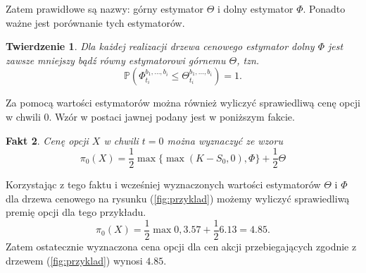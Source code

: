 \documentclass[12pt]{article}
\newtheorem{theorem}{Twierdzenie}
\newtheorem{fact}[theorem]{Fakt}
\begin{document}
\noindent Zatem prawidłowe są nazwy: górny estymator $\Theta$ i dolny estymator $\Phi$. Ponadto ważne jest porównanie tych estymatorów.
\begin{theorem}
Dla każdej realizacji drzewa cenowego estymator dolny $\Phi$ jest zawsze mniejszy bądź równy estymatorowi górnemu $\Theta$, tzn.
\begin{equation*}
\mathbb{P}(\Phi_{t_i}^{b_1,\ldots,b_i}\leq \Theta_{t_i}^{b_1,\ldots,b_i}) = 1.
\end{equation*}
\end{theorem} 

\noindent Za pomocą wartości estymatorów można również wyliczyć sprawiedliwą cenę opcji w chwili $0$. Wzór w postaci jawnej podany jest w poniższym fakcie.
\begin{fact}
Cenę opcji $X$ w chwili $t=0$ można wyznaczyć ze wzoru
\begin{equation*}
\pi_0(X) = \frac{1}{2}\max\{\max(K-S_0,0),\Phi\} + \frac{1}{2}\Theta
\end{equation*}
\end{fact}

\noindent Korzystając z tego faktu i wcześniej wyznaczonych wartości estymatorów $\Theta$ i $\Phi$ dla drzewa cenowego na rysunku (\ref{fig:przyklad}) możemy wyliczyć sprawiedliwą premię opcji dla tego przykładu.
\begin{equation*}
\pi_0(X) = \frac{1}{2}\max{0,3.57}+\frac{1}{2} 6.13 = 4.85.
\end{equation*}
Zatem ostatecznie wyznaczona cena opcji dla cen akcji przebiegających zgodnie z drzewem (\ref{fig:przyklad}) wynosi $4.85.$
\end{document}
